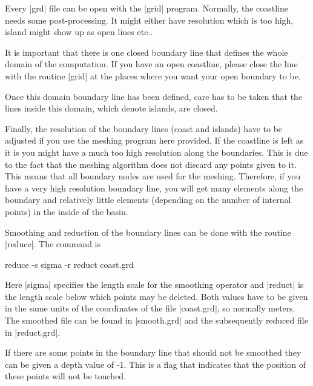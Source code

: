 

Every |grd| file can be open with the |grid| program.
Normally, the coastline needs some post-processing.
It might either have resolution which is too high, island
might show up as open lines etc..

It is important that there is one closed boundary line that
defines the whole domain of the computation. If you have an
open coastline, please close the line with the routine |grid|
at the places where you want your open boundary to be.

Once this domain boundary line has been defined, care has
to be taken that the lines inside this domain, which denote
islands, are closed.

Finally, the resolution of the boundary lines (coast and islands)
have to be adjusted if you use the meshing program here provided. 
If the coastline is left as it is you might
have a much too high resolution along the boundaries. This is due
to the fact that the meshing algorithm does not discard any points
given to it. This means that all boundary nodes are used for the meshing.
Therefore, if you have a very high resolution boundary line, you will
get many elements along the boundary and relatively little elements
(depending on the number of internal points) in the inside of the
basin.

Smoothing and reduction of the boundary lines can be done with the
routine |reduce|. The command is

\begin{code}
    reduce -s sigma -r reduct coast.grd
\end{code}

Here |sigma| specifies the length scale for the smoothing operator
and |reduct| is the length scale below which points may be deleted.
Both values have to be given in the same units of the coordinates
of the file |coast.grd|, so normally meters.
The smoothed file can be found in |smooth.grd| and the subsequently
reduced file in |reduct.grd|. 

If there are some points in the boundary line that should not be smoothed
they can be given a depth value of -1. This is a flag that indicates
that the position of these points will not be touched.


